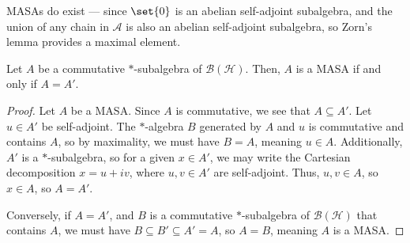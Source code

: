 \documentclass[10pt]{mypackage}
\begin{document}
\begin{remark}
  MASAs do exist --- since $\set{0}$  is an abelian self-adjoint subalgebra, and the union of any chain in $\mathcal{A}$ is also an abelian self-adjoint subalgebra, so Zorn's lemma provides a maximal element.
\end{remark}
\begin{proposition}
  Let $A$ be a commutative $\ast$-subalgebra of $\mathcal{B}\left(\mathcal{H}\right)$. Then, $A$ is a MASA if and only if $A = A'$.
\end{proposition}
\begin{proof}
  Let $A$ be a MASA. Since $A$ is commutative, we see that $A\subseteq A'$. Let $u\in A'$ be self-adjoint. The $\ast$-algebra $B$ generated by $A$ and $u$ is commutative and contains $A$, so by maximality, we must have $B = A$, meaning $u\in A$. Additionally, $A'$ is a $\ast$-subalgebra, so for a given $x\in A'$, we may write the Cartesian decomposition $x = u + iv$, where $u,v\in A'$ are self-adjoint. Thus, $u,v\in A$, so $x\in A$, so $A = A'$.\newline

  Conversely, if $A = A'$, and $B$ is a commutative $\ast$-subalgebra of $\mathcal{B}\left(\mathcal{H}\right)$ that contains $A$, we must have $B\subseteq B' \subseteq A' = A$, so $A = B$, meaning $A$ is a MASA.
\end{proof}
\end{document}
